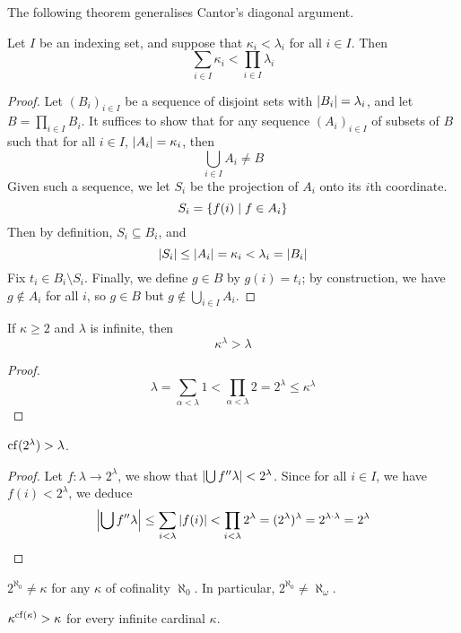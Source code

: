 The following theorem generalises Cantor's diagonal argument.
\begin{theorem}
    Let \( I \) be an indexing set, and suppose that \( \kappa_i < \lambda_i \) for all \( i \in I \).
    Then
    \[ \sum_{i \in I} \kappa_i < \prod_{i \in I} \lambda_i \]
\end{theorem}
\begin{proof}
    Let \( (B_i)_{i \in I} \) be a sequence of disjoint sets with \( \abs{B_i} = \lambda_i \), and let \( B = \prod_{i \in I} B_i \).
    It suffices to show that for any sequence \( (A_i)_{i \in I} \) of subsets of \( B \) such that for all \( i \in I \), \( \abs{A_i} = \kappa_i \), then
    \[ \bigcup_{i \in I} A_i \neq B \]
    Given such a sequence, we let \( S_i \) be the projection of \( A_i \) onto its \( i \)th coordinate.
    \[ S_i = \qty{f(i) \mid f \in A_i} \]
    Then by definition, \( S_i \subseteq B_i \), and
    \[ \abs{S_i} \leq \abs{A_i} = \kappa_i < \lambda_i = \abs{B_i} \]
    Fix \( t_i \in B_i \setminus S_i \).
    Finally, we define \( g \in B \) by \( g(i) = t_i \); by construction, we have \( g \notin A_i \) for all \( i \), so \( g \in B \) but \( g \notin \bigcup_{i \in I} A_i \).
\end{proof}
\begin{corollary}
    If \( \kappa \geq 2 \) and \( \lambda \) is infinite, then
    \[ \kappa^\lambda > \lambda \]
\end{corollary}
\begin{proof}
    \[ \lambda = \sum_{\alpha < \lambda} 1 < \prod_{\alpha < \lambda} 2 = 2^\lambda \leq \kappa^\lambda \]
\end{proof}
\begin{corollary}
    \( \operatorname{cf}(2^\lambda) > \lambda \).
\end{corollary}
\begin{proof}
    Let \( f : \lambda \to 2^\lambda \), we show that \( \abs{\bigcup f '' \lambda} < 2^\lambda \).
    Since for all \( i \in I \), we have \( f(i) < 2^\lambda \), we deduce
    \[ \abs{\bigcup f '' \lambda} \leq \sum_{i < \lambda} \abs{f(i)} < \prod_{i < \lambda} 2^\lambda = (2^\lambda)^\lambda = 2^{\lambda \cdot \lambda} = 2^\lambda \]
\end{proof}
\begin{corollary}
    \( 2^{\aleph_0} \neq \kappa \) for any \( \kappa \) of cofinality \( \aleph_0 \).
    In particular, \( 2^{\aleph_0} \neq \aleph_\omega \).
\end{corollary}
\begin{corollary}
    \( \kappa^{\operatorname{cf}(\kappa)} > \kappa \) for every infinite cardinal \( \kappa \).
\end{corollary}
